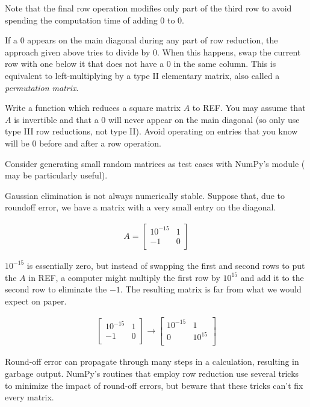 Note that the final row operation modifies only part of the third row to avoid spending the computation time of adding $0$ to $0$.

If a $0$ appears on the main diagonal during any part of row reduction, the approach given above tries to divide by $0$.
When this happens, swap the current row with one below it that does not have a $0$ in the same column.
This is equivalent to left-multiplying by a type II elementary matrix, also called a \emph{permutation matrix}.

\begin{problem} %
Write a function which reduces a square matrix $A$ to REF.
You may assume that $A$ is invertible and that a $0$ will never appear on the main diagonal (so only use type III row reductions, not type II).
Avoid operating on entries that you know will be $0$ before and after a row operation.

Consider generating small random matrices as test cases with NumPy's  module ( may be particularly useful).
\label{prob:ref-row-reduction}
\end{problem}

\begin{warn} %
Gaussian elimination is not always numerically stable.
Suppose that, due to roundoff error, we have a matrix with a very small entry on the diagonal.

\begin{align*}
A = \left[\begin{array}{cc}
10^{-15} & 1 \\
-1 & 0 \\
\end{array}\right]
\end{align*}

$10^{-15}$ is essentially zero, but instead of swapping the first and second rows to put the $A$ in REF, a computer might multiply the first row by $10^{15}$ and add it to the second row to eliminate the $-1$.
The resulting matrix is far from what we would expect on paper.

\begin{align*}
\left[\begin{array}{cc}
10^{-15} & 1 \\
-1 & 0 \\
\end{array}\right]
\longrightarrow
\left[\begin{array}{cc}
10^{-15} & 1 \\
0 & 10^{15} \\
\end{array}\right]
\end{align*}

Round-off error can propagate through many steps in a calculation, resulting in garbage output.
NumPy's routines that employ row reduction use several tricks to minimize the impact of round-off errors, but beware that these tricks can't fix every matrix.
\end{warn}

